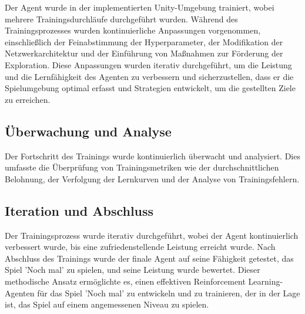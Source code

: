 Der Agent wurde in der implementierten Unity-Umgebung trainiert, wobei mehrere Trainingsdurchläufe durchgeführt wurden. Während des Trainingsprozesses wurden kontinuierliche Anpassungen vorgenommen, einschließlich der Feinabstimmung der Hyperparameter, der Modifikation der Netzwerkarchitektur und der Einführung von Maßnahmen zur Förderung der Exploration. Diese Anpassungen wurden iterativ durchgeführt, um die Leistung und die Lernfähigkeit des Agenten zu verbessern und sicherzustellen, dass er die Spielumgebung optimal erfasst und Strategien entwickelt, um die gestellten Ziele zu erreichen.

\subsection{Überwachung und Analyse}
Der Fortschritt des Trainings wurde kontinuierlich überwacht und analysiert. Dies umfasste die Überprüfung von Trainingsmetriken wie der durchschnittlichen Belohnung, der Verfolgung der Lernkurven und der Analyse von Trainingsfehlern.

\subsection{Iteration und Abschluss}
Der Trainingsprozess wurde iterativ durchgeführt, wobei der Agent kontinuierlich verbessert wurde, bis eine zufriedenstellende Leistung erreicht wurde. Nach Abschluss des Trainings wurde der finale Agent auf seine Fähigkeit getestet, das Spiel 'Noch mal' zu spielen, und seine Leistung wurde bewertet.
Dieser methodische Ansatz ermöglichte es, einen effektiven Reinforcement Learning-Agenten für das Spiel 'Noch mal' zu entwickeln und zu trainieren, der in der Lage ist, das Spiel auf einem angemessenen Niveau zu spielen.